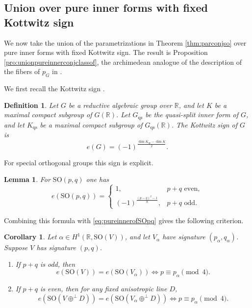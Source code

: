\documentclass[12pt]{amsart}
\numberwithin{equation}{subsection}
\newcommand{\BR}{{\mathbb {R}}}
\newcommand{\SO}{{\mathrm{SO}}}
\def\alp{{\alpha}}
\def\qs{\mathrm{qs}}
\def\SO{\mathrm{SO}}
\newtheorem{defin}[thm]{Definition}
\newtheorem{lem}[thm]{Lemma}
\newtheorem{cor}[thm]{Corollary}
\begin{document}
\subsection{Union over pure inner forms with fixed Kottwitz sign}
\label{subsec:unionoverpure}

We now take the union of the parametrizations in Theorem \ref{thm:parconjso}
over pure inner forms with fixed Kottwitz sign. The result is Proposition
\ref{pro:unionpureinnerconjclassof}, the archimedean analogue of the
description of the fibers of $p_G$ in \cite[\S 1.4]{MR3155345}.

We first recall the Kottwitz sign \cite{kottsign}.

\begin{defin}\label{defin:kottwitzsign}
Let $G$ be a reductive algebraic group over $\BR$, and let $K$ be a maximal
compact subgroup of $G(\BR)$. Let $G_\qs$ be the quasi-split inner form of
$G$, and let $K_\qs$ be a maximal compact subgroup of $G_\qs(\BR)$. The
Kottwitz sign of $G$ is
\[
e(G)=(-1)^{\frac{\dim K_\qs-\dim K}{2}}.
\]
\end{defin}

For special orthogonal groups this sign is explicit.

\begin{lem}\label{lem:kottwitzsignsopq}
For $\SO(p,q)$ one has
\[
e(\SO(p,q))
=
\begin{cases}
1, & p+q \text{ even},\\
(-1)^{\frac{(p-q)^2-1}{8}}, & p+q \text{ odd}.
\end{cases}
\]
\end{lem}

Combining this formula with \eqref{eq:pureinnerofSOpq} gives the following
criterion.

\begin{cor}\label{cor:pureinnerformsopq}
Let $\alp\in H^1(\BR,\SO(V))$, and let $V_\alp$ have signature
$(p_\alp,q_\alp)$. Suppose $V$ has signature $(p,q)$.

\begin{enumerate}
\item
If $p+q$ is odd, then
\[
e(\SO(V))=e(\SO(V_\alp))
\Longleftrightarrow
p\equiv p_\alp \pmod{4}.
\]

\item
If $p+q$ is even, then for any fixed anisotropic line $D$,
\[
e(\SO(V\oplus^\perp D))
=
e(\SO(V_\alp\oplus^\perp D))
\Longleftrightarrow
p\equiv p_\alp \pmod{4}.
\]
\end{enumerate}
\end{cor}
\end{document}
